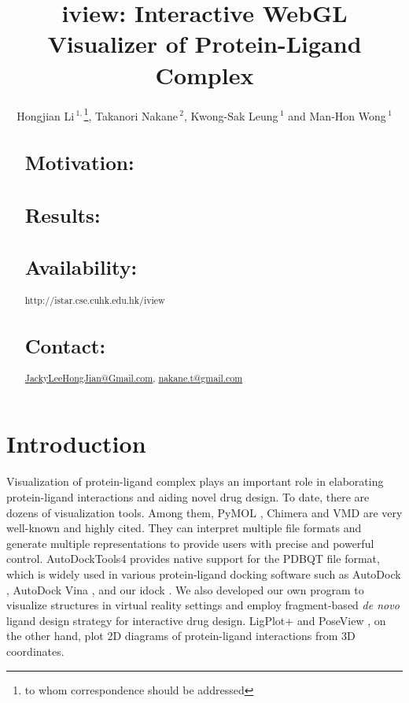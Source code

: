 \documentclass{bioinfo}
\begin{document}

\title[iview]{iview: Interactive WebGL Visualizer of Protein-Ligand Complex}
\author[Hongjian Li \textit{et~al}]{Hongjian Li\,$^{1,}$\footnote{to whom correspondence should be addressed}, Takanori Nakane\,$^{2}$, Kwong-Sak Leung\,$^{1}$ and Man-Hon Wong\,$^{1}$}
\address{$^{1}$Department of Computer Science and Engineering, Chinese University of Hong Kong, Hong Kong\\
$^{2}$Graduate School of Medicine, Kyoto University, Japan}



\maketitle

\begin{abstract}

\section{Motivation:}

\section{Results:}

\section{Availability:}
http://istar.cse.cuhk.edu.hk/iview

\section{Contact:} \href{JackyLeeHongJian@Gmail.com}{JackyLeeHongJian@Gmail.com}, \href{nakane.t@gmail.com}{nakane.t@gmail.com}
\end{abstract}

\section{Introduction}

Visualization of protein-ligand complex plays an important role in elaborating protein-ligand interactions and aiding novel drug design. To date, there are dozens of visualization tools. Among them, PyMOL \citep{1221}, Chimera \citep{1219} and VMD \citep{1220} are very well-known and highly cited. They can interpret multiple file formats and generate multiple representations to provide users with precise and powerful control. AutoDockTools4 \citep{596} provides native support for the PDBQT file format, which is widely used in various protein-ligand docking software such as AutoDock \citep{596}, AutoDock Vina \citep{595}, and our idock \citep{1153}. We also developed our own program \citep{1265} to visualize structures in virtual reality settings and employ fragment-based \textit{de novo} ligand design strategy for interactive drug design. LigPlot+ \citep{951} and PoseView \citep{748}, on the other hand, plot 2D diagrams of protein-ligand interactions from 3D coordinates.
\end{document}
